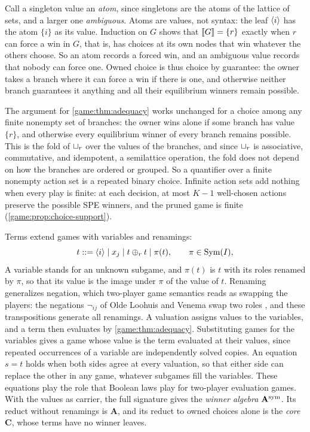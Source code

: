 Call a singleton value an \emph{atom}, since singletons are the atoms of the lattice of sets, and a larger one \emph{ambiguous}. Atoms are values, not syntax: the leaf $\langle i\rangle$ has the atom $\{i\}$ as its value. Induction on $G$ shows that $\llbracket G\rrbracket=\{r\}$ exactly when $r$ can force a win in $G$, that is, has choices at its own nodes that win whatever the others choose. So an atom records a forced win, and an ambiguous value records that nobody can force one. Owned choice is thus choice by guarantee: the owner takes a branch where it can force a win if there is one, and otherwise neither branch guarantees it anything and all their equilibrium winners remain possible.

The argument for \cref{game:thm:adequacy} works unchanged for a choice among any finite nonempty set of branches: the owner wins alone if some branch has value $\{r\}$, and otherwise every equilibrium winner of every branch remains possible. This is the fold of $\mathbin{\sqcup_{r}}$ over the values of the branches, and since $\mathbin{\sqcup_{r}}$ is associative, commutative, and idempotent, a semilattice operation, the fold does not depend on how the branches are ordered or grouped. So a quantifier over a finite nonempty action set is a repeated binary choice. Infinite action sets add nothing when every play is finite: at each decision, at most $K-1$ well-chosen actions preserve the possible SPE winners, and the pruned game is finite (\cref{game:prop:choice-support}).

Terms extend games with variables and renamings:
\[
 t ::= \langle i\rangle\mid x_j\mid t\mathbin{\oplus_{r}} t\mid\pi(t),
 \qquad \pi\in\operatorname{Sym}(I),
\]
A variable stands for an unknown subgame, and $\pi(t)$ is $t$ with its roles renamed by $\pi$, so that its value is the image under $\pi$ of the value of $t$. Renaming generalizes negation, which two-player game semantics reads as swapping the players: the negations $\neg_{ij}$ of Olde Loohuis and Venema swap two roles \cite{OldeLoohuisVenema2010}, and these transpositions generate all renamings. A valuation assigns values to the variables, and a term then evaluates by \cref{game:thm:adequacy}. Substituting games for the variables gives a game whose value is the term evaluated at their values, since repeated occurrences of a variable are independently solved copies. An equation $s=t$ holds when both sides agree at every valuation, so that either side can replace the other in any game, whatever subgames fill the variables. These equations play the role that Boolean laws play for two-player evaluation games. With the values as carrier, the full signature gives the \emph{winner algebra} $\mathbf A^{\rm sym}$. Its reduct without renamings is $\mathbf A$, and its reduct to owned choices alone is the \emph{core} $\mathbf C$, whose terms have no winner leaves.

